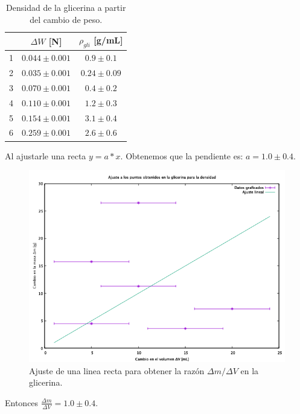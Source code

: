 \documentclass[a4paper]{article}
\begin{document}
\begin{table}[H]
  \centering
    \begin{tabular}{|c|c|c|} \hline
          & $\Delta W$ [N] & $\rho_{gli}$ [g/mL]  \\ \hline
    1     & $0.044\pm0.001$ & $0.9\pm0.1$  \\ \hline
    2     & $0.035\pm0.001$ & $0.24\pm0.09$  \\ \hline
    3     & $0.070\pm0.001$ & $0.4\pm0.2$  \\ \hline
    4     & $0.110\pm0.001$ & $1.2\pm0.3$  \\ \hline
    5     & $0.154\pm0.001$ & $3.1\pm0.4$  \\ \hline
    6     & $0.259\pm0.001$ & $2.6\pm0.6$  \\ \hline
    \end{tabular}%
  \caption{Densidad de la glicerina a partir del cambio de peso.}
\end{table}%

Al ajustarle una recta $y = a*x$. Obtenemos que la pendiente es: $a = 1.0 \pm 0.4$.
\begin{figure}[H]
    \centering
    \includegraphics[width=12cm]{Glicerinaden.png}
    \caption{Ajuste de una linea recta para obtener la razón $\Delta m / \Delta V$ en la glicerina.}
\end{figure}

Entonces $\frac{\Delta m}{\Delta V} = 1.0 \pm 0.4$.
\end{document}
